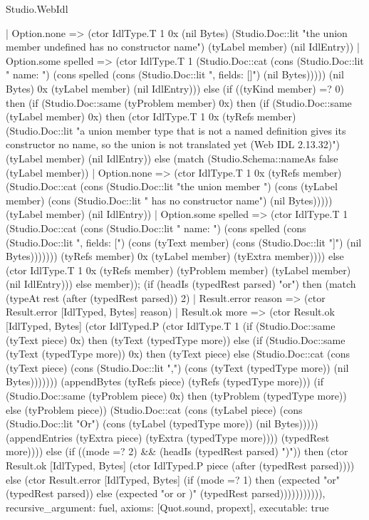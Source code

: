 \begin{lexlean}{Studio.WebIdl}
\begin{semanticmodule}
{    | Option.none => (ctor IdlType.T 1 0x (nil Bytes) (Studio.Doc::lit "the union member undefined has no constructor name") (tyLabel member) (nil IdlEntry))
    | Option.some spelled => (ctor IdlType.T 1 (Studio.Doc::cat (cons (Studio.Doc::lit "    {name: ") (cons spelled (cons (Studio.Doc::lit ", fields: []}") (nil Bytes))))) (nil Bytes) 0x (tyLabel member) (nil IdlEntry))) else (if ((tyKind member) =? 0) then (if (Studio.Doc::same (tyProblem member) 0x) then (if (Studio.Doc::same (tyLabel member) 0x) then (ctor IdlType.T 1 0x (tyRefs member) (Studio.Doc::lit "a union member type that is not a named definition gives its constructor no name, so the union is not translated yet (Web IDL 2.13.32)") (tyLabel member) (nil IdlEntry)) else (match (Studio.Schema::nameAs false (tyLabel member))
    | Option.none => (ctor IdlType.T 1 0x (tyRefs member) (Studio.Doc::cat (cons (Studio.Doc::lit "the union member ") (cons (tyLabel member) (cons (Studio.Doc::lit " has no constructor name") (nil Bytes))))) (tyLabel member) (nil IdlEntry))
    | Option.some spelled => (ctor IdlType.T 1 (Studio.Doc::cat (cons (Studio.Doc::lit "    {name: ") (cons spelled (cons (Studio.Doc::lit ", fields: [") (cons (tyText member) (cons (Studio.Doc::lit "]}") (nil Bytes))))))) (tyRefs member) 0x (tyLabel member) (tyExtra member)))) else (ctor IdlType.T 1 0x (tyRefs member) (tyProblem member) (tyLabel member) (nil IdlEntry))) else member)); (if (headIs (typedRest parsed) "or") then (match (typeAt rest (after (typedRest parsed)) 2)
    | Result.error reason => (ctor Result.error [IdlTyped, Bytes] reason)
    | Result.ok more => (ctor Result.ok [IdlTyped, Bytes] (ctor IdlTyped.P (ctor IdlType.T 1 (if (Studio.Doc::same (tyText piece) 0x) then (tyText (typedType more)) else (if (Studio.Doc::same (tyText (typedType more)) 0x) then (tyText piece) else (Studio.Doc::cat (cons (tyText piece) (cons (Studio.Doc::lit ",\n") (cons (tyText (typedType more)) (nil Bytes))))))) (appendBytes (tyRefs piece) (tyRefs (typedType more))) (if (Studio.Doc::same (tyProblem piece) 0x) then (tyProblem (typedType more)) else (tyProblem piece)) (Studio.Doc::cat (cons (tyLabel piece) (cons (Studio.Doc::lit "Or") (cons (tyLabel (typedType more)) (nil Bytes))))) (appendEntries (tyExtra piece) (tyExtra (typedType more)))) (typedRest more)))) else (if ((mode =? 2) && (headIs (typedRest parsed) ")")) then (ctor Result.ok [IdlTyped, Bytes] (ctor IdlTyped.P piece (after (typedRest parsed)))) else (ctor Result.error [IdlTyped, Bytes] (if (mode =? 1) then (expected "or" (typedRest parsed)) else (expected "or or )" (typedRest parsed))))))))))),
  recursive_argument: fuel,
  axioms: [Quot.sound, propext],
  executable: true
}


\end{semanticmodule}
\end{lexlean}
